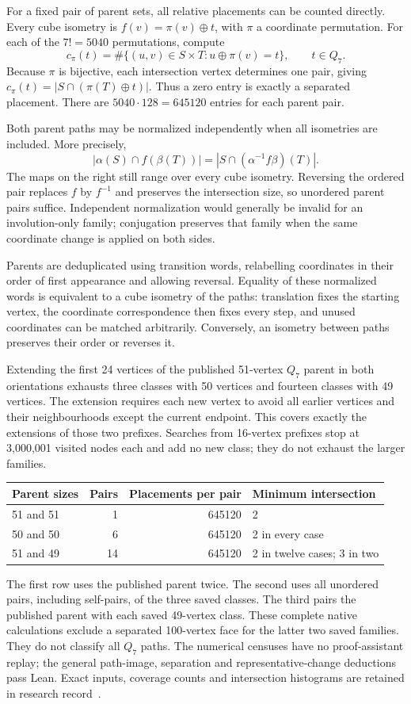 \documentclass[11pt,a4paper]{article}
\theoremstyle{definition}
\theoremstyle{remark}
\begin{document}
For a fixed pair of parent sets, all relative placements can be counted
directly. Every cube isometry is $f(v)=\pi(v)\oplus t$, with $\pi$ a
coordinate permutation. For each of the $7!=5040$ permutations, compute
\[
c_\pi(t)=\#\{(u,v)\in S\times T:u\oplus\pi(v)=t\},
\qquad t\in Q_7.
\]
Because $\pi$ is bijective, each intersection vertex determines one
pair, giving $c_\pi(t)=|S\cap(\pi(T)\oplus t)|$. Thus a zero entry is
exactly a separated placement. There are $5040\cdot128=645120$ entries
for each parent pair.

Both parent paths may be normalized independently when all isometries
are included. More precisely,
\[
|\alpha(S)\cap f(\beta(T))|
=|S\cap(\alpha^{-1}f\beta)(T)|.
\]
The maps on the right still range over every cube isometry.
Reversing the ordered pair replaces $f$ by $f^{-1}$ and preserves the
intersection size, so unordered parent pairs suffice. Independent
normalization would generally be invalid for an involution-only family;
conjugation preserves that family when the same coordinate change is
applied on both sides.

Parents are deduplicated using transition words, relabelling coordinates
in their order of first appearance and allowing reversal. Equality of
these normalized words is equivalent to a cube isometry of the paths:
translation fixes the starting vertex, the coordinate correspondence
then fixes every step, and unused coordinates can be matched arbitrarily.
Conversely, an isometry between paths preserves their order or reverses it.

Extending the first 24 vertices of the published 51-vertex $Q_7$ parent
in both orientations exhausts three classes with 50 vertices and fourteen
classes with 49 vertices. The extension requires each new vertex to avoid
all earlier vertices and their neighbourhoods except the current endpoint.
This covers exactly the extensions of those two prefixes. Searches from
16-vertex prefixes stop at 3,000,001 visited nodes each and add no new class;
they do not exhaust the larger families.

\begin{center}
\begin{tabular}{lrrl}
\toprule
Parent sizes & Pairs & Placements per pair & Minimum intersection\\
\midrule
51 and 51 & 1 & 645120 & 2\\
50 and 50 & 6 & 645120 & 2 in every case\\
51 and 49 & 14 & 645120 & 2 in twelve cases; 3 in two\\
\bottomrule
\end{tabular}
\end{center}
The first row uses the published parent twice. The second uses all
unordered pairs, including self-pairs, of the three saved classes.
The third pairs the published parent with each saved 49-vertex class.
These complete native calculations exclude a separated 100-vertex face
for the latter two saved families. They do not classify all $Q_7$ paths.
The numerical censuses have no proof-assistant replay; the general
path-image, separation and representative-change deductions pass Lean.
Exact inputs, coverage counts and intersection histograms are retained
in research record~\cite{research199}.
\end{document}
